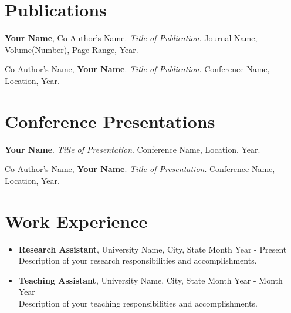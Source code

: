 \documentclass[a4paper,11pt]{article}
\begin{document}

\section*{Publications}

\begin{enumerate}[label={[\arabic*]},leftmargin=*]
    \item \textbf{Your Name}, Co-Author's Name. \textit{Title of Publication}. Journal Name, Volume(Number), Page Range, Year.
    
    \item Co-Author's Name, \textbf{Your Name}. \textit{Title of Publication}. Conference Name, Location, Year.
\end{enumerate}


\section*{Conference Presentations}

\begin{enumerate}[label={[\arabic*]},leftmargin=*]
    \item \textbf{Your Name}. \textit{Title of Presentation}. Conference Name, Location, Year.
    
    \item Co-Author's Name, \textbf{Your Name}. \textit{Title of Presentation}. Conference Name, Location, Year.
\end{enumerate}


\section*{Work Experience}

\begin{itemize}[leftmargin=*]
    \item \textbf{Research Assistant}, University Name, City, State \hfill Month Year - Present \\
    Description of your research responsibilities and accomplishments.
    
    \item \textbf{Teaching Assistant}, University Name, City, State \hfill Month Year - Month Year \\
    Description of your teaching responsibilities and accomplishments.
\end{itemize}
\end{document}
